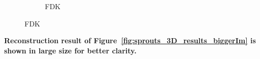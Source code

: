 \documentclass{article}
\begin{document}
\begin{figure}[!h]
    \begin{subfigure}[b]{\linewidth}
\captionsetup{labelformat=empty}
        \caption{\large{FDK}}
     \end{subfigure}
\end{figure}
\newpage
\textbf{Reconstruction result of Figure~\ref{fig:sprouts_3D_results_biggerIm}  is shown in large size for better clarity.}\\
\end{document}
